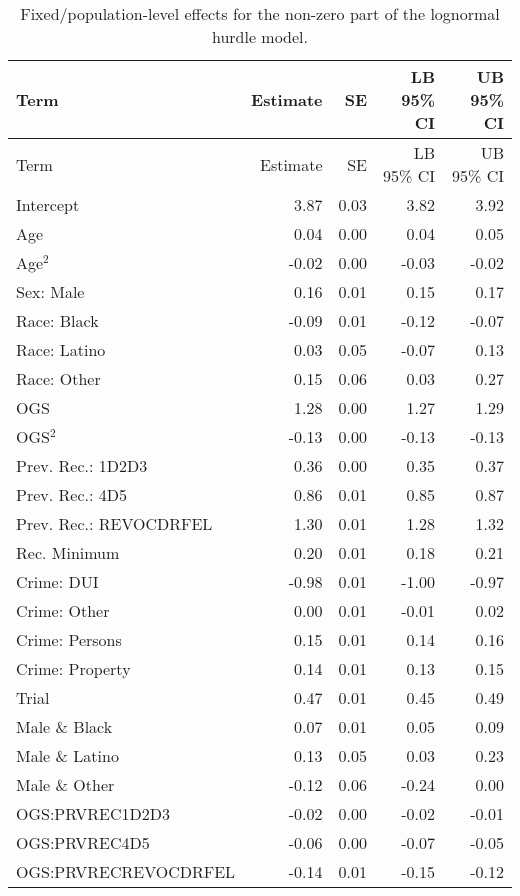 \documentclass[
  letterpaper,
  DIV=11,
  numbers=noendperiod]{scrartcl}
\begin{document}
\hypertarget{tbl-brms-hurdle-model-summary-2}{}
\begin{longtable}[]{@{}lrrrr@{}}
\caption{\label{tbl-brms-hurdle-model-summary-2}Fixed/population-level
effects for the non-zero part of the lognormal hurdle
model.}\tabularnewline
\toprule\noalign{}
Term & Estimate & SE & LB 95\% CI & UB 95\% CI \\
\midrule\noalign{}
\endfirsthead
\toprule\noalign{}
Term & Estimate & SE & LB 95\% CI & UB 95\% CI \\
\midrule\noalign{}
\endhead
\bottomrule\noalign{}
\endlastfoot
Intercept & 3.87 & 0.03 & 3.82 & 3.92 \\
Age & 0.04 & 0.00 & 0.04 & 0.05 \\
Age\(^2\) & -0.02 & 0.00 & -0.03 & -0.02 \\
Sex: Male & 0.16 & 0.01 & 0.15 & 0.17 \\
Race: Black & -0.09 & 0.01 & -0.12 & -0.07 \\
Race: Latino & 0.03 & 0.05 & -0.07 & 0.13 \\
Race: Other & 0.15 & 0.06 & 0.03 & 0.27 \\
OGS & 1.28 & 0.00 & 1.27 & 1.29 \\
OGS\(^2\) & -0.13 & 0.00 & -0.13 & -0.13 \\
Prev. Rec.: 1D2D3 & 0.36 & 0.00 & 0.35 & 0.37 \\
Prev. Rec.: 4D5 & 0.86 & 0.01 & 0.85 & 0.87 \\
Prev. Rec.: REVOCDRFEL & 1.30 & 0.01 & 1.28 & 1.32 \\
Rec. Minimum & 0.20 & 0.01 & 0.18 & 0.21 \\
Crime: DUI & -0.98 & 0.01 & -1.00 & -0.97 \\
Crime: Other & 0.00 & 0.01 & -0.01 & 0.02 \\
Crime: Persons & 0.15 & 0.01 & 0.14 & 0.16 \\
Crime: Property & 0.14 & 0.01 & 0.13 & 0.15 \\
Trial & 0.47 & 0.01 & 0.45 & 0.49 \\
Male \& Black & 0.07 & 0.01 & 0.05 & 0.09 \\
Male \& Latino & 0.13 & 0.05 & 0.03 & 0.23 \\
Male \& Other & -0.12 & 0.06 & -0.24 & 0.00 \\
OGS:PRVREC1D2D3 & -0.02 & 0.00 & -0.02 & -0.01 \\
OGS:PRVREC4D5 & -0.06 & 0.00 & -0.07 & -0.05 \\
OGS:PRVRECREVOCDRFEL & -0.14 & 0.01 & -0.15 & -0.12 \\
\end{longtable}
\end{document}
